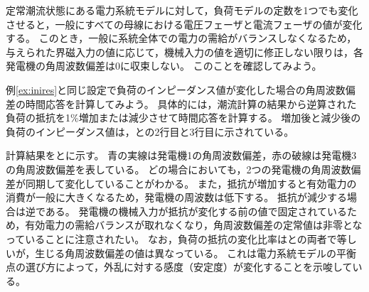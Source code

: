 \documentclass[tombow,dvipdfmx]{corona-a5-1.1}
\begin{document}
定常潮流状態にある電力系統モデルに対して，負荷モデルの定数を1つでも変化させると，一般にすべての母線における電圧フェーザと電流フェーザの値が変化する。
このとき，一般に系統全体での電力の需給がバランスしなくなるため，与えられた界磁入力の値に応じて，機械入力の値を適切に修正しない限りは，各発電機の角周波数偏差は0に収束しない。
このことを確認してみよう。

\begin{例}[負荷のインピーダンス変化に対する電力系統モデルの時間応答]\label{ex:loadpv}
例\ref{ex:inires}と同じ設定で負荷のインピーダンス値が変化した場合の角周波数偏差の時間応答を計算してみよう。
具体的には，潮流計算の結果から逆算された負荷の抵抗を1\%増加または減少させて時間応答を計算する。
増加後と減少後の負荷のインピーダンス値は，との2行目と3行目に示されている。

計算結果をとに示す。
青の実線は発電機1の角周波数偏差，赤の破線は発電機3の角周波数偏差を表している。
どの場合においても，2つの発電機の角周波数偏差が同期して変化していることがわかる。
また，抵抗が増加すると有効電力の消費が一般に大きくなるため，発電機の周波数は低下する。
抵抗が減少する場合は逆である。
発電機の機械入力が抵抗が変化する前の値で固定されているため，有効電力の需給バランスが取れなくなり，角周波数偏差の定常値は非零となっていることに注意されたい。
なお，負荷の抵抗の変化比率はとの両者で等しいが，生じる角周波数偏差の値は異なっている。
これは電力系統モデルの平衡点の選び方によって，外乱に対する感度（安定度）が変化することを示唆している。
\end{例}
\end{document}
